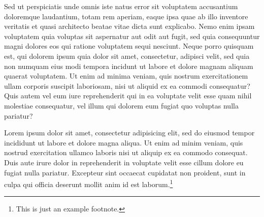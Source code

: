 Sed ut perspiciatis unde omnis iste natus error sit voluptatem accusantium doloremque laudantium, totam rem aperiam, eaque ipsa quae ab illo inventore veritatis et quasi architecto beatae vitae dicta sunt explicabo. Nemo enim ipsam voluptatem quia voluptas sit aspernatur aut odit aut fugit, sed quia consequuntur magni dolores eos qui ratione voluptatem sequi nesciunt. Neque porro quisquam est, qui dolorem ipsum quia dolor sit amet, consectetur, adipisci velit, sed quia non numquam eius modi tempora incidunt ut labore et dolore magnam aliquam quaerat voluptatem. Ut enim ad minima veniam, quis nostrum exercitationem ullam corporis suscipit laboriosam, nisi ut aliquid ex ea commodi consequatur? Quis autem vel eum iure reprehenderit qui in ea voluptate velit esse quam nihil molestiae consequatur, vel illum qui dolorem eum fugiat quo voluptas nulla pariatur?


Lorem ipsum dolor sit amet, consectetur adipisicing elit, sed do eiusmod tempor incididunt ut labore et dolore magna aliqua. Ut enim ad minim veniam, quis nostrud exercitation ullamco laboris nisi ut aliquip ex ea commodo consequat. Duis aute irure dolor in reprehenderit in voluptate velit esse cillum dolore eu fugiat nulla pariatur. Excepteur sint occaecat cupidatat non proident, sunt in culpa qui officia deserunt mollit anim id est laborum.\footnote{This is just an example footnote.} 

